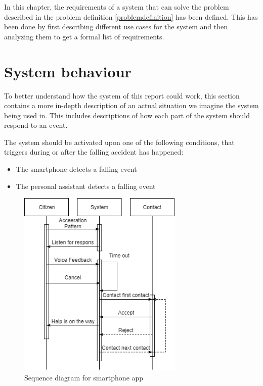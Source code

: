 In this chapter, the requirements of a system that can solve the problem described in the problem definition \ref{problemdefinition} has been defined. This has been done by first describing different use cases for the system and then analyzing them to get a formal list of requirements.

\section{System behaviour}
To better understand how the system of this report could work, this section contains a more in-depth description of an actual situation we imagine the system being used in. This includes descriptions of how each part of the system should respond to an event.

The system should be activated upon one of the following conditions, that triggers during or after the falling accident has happened:

\begin{itemize}
    \item The smartphone detects a falling event
    \item The personal assistant detects a falling event
\end{itemize}

\begin{figure}[H]
    \centering
    \includegraphics[width=0.7\textwidth]{Figures/Phone.png}
    \caption{Sequence diagram for smartphone app}
    \label{fig:SmartPhoneApp}
\end{figure}

